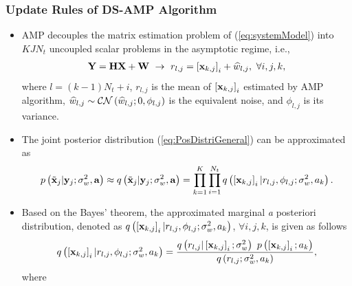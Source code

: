 \documentclass[9pt]{beamer}
\let \it = \textit
\begin{document}
\begin{frame}
\frametitle{Update Rules of DS-AMP Algorithm}
\begin{itemize}
\item
AMP decouples the matrix estimation problem of (\ref{eq:systemModel}) into $KJN_t$ uncoupled scalar problems in the asymptotic regime, i.e.,
\begin{equation}\label{eq:systemdecoupled}
\begin{array}{l}
{\bf{Y}=\bf{ H}\bf{X}+{\bf{W}}}~\rightarrow~r_{l,j}=\left[{{\bf x}_{k,j}}\right]_i+\widehat{w}_{l,j},~\forall i,j,k,
\end{array}
\end{equation}
where $l=(k-1)N_t+i$, $r_{l,j}$ is the mean of $\left[{{\bf x}_{k,j}}\right]_i$ estimated by AMP algorithm, $\widehat{w}_{l,j}\sim{\cal C}{\cal N}\left({{\widehat{w}_{l,j};0,\phi_{l,j}}}\right)$ is the equivalent noise, and $\phi_{l,j}$ is its variance.
\item 
The joint posterior distribution (\ref{eq:PosDistriGeneral}) can be approximated as
\begin{align}
\label{eq:PosDistriApproxi}p\left({\tilde{\bf x}_j|{\bf y}_j;\sigma_w^2, {\bf a}}\right)\approx q\left({\tilde{\bf x}_j|{\bf y}_j;\sigma_w^2, {\bf a}}\right)
=\prod\limits_{k=1}^{K}\prod\limits_{i=1}^{N_t}q\left({\left[{{\bf x}_{k,j}}\right]_i|r_{l,j}, \phi_{l,j};\sigma_w^2, a_k}\right).
\end{align}
\item
Based on the Bayes' theorem, the approximated marginal {\it a posteriori} distribution, denoted as $q\left({\left[{{\bf x}_{k,j}}\right]_i|r_{l,j}, \phi_{l,j};\sigma_w^2, a_k}\right)$, $\forall i,j,k$, is given as follows
\begin{equation}\label{eq:PosMarginalAMP}
\begin{array}{l}
q\left({\left[{{\bf x}_{k,j}}\right]_i|r_{l,j}, \phi_{l,j};\sigma_w^2, a_k}\right)
=\dfrac{q\left({r_{l,j}|\left[{{\bf x}_{k,j}}\right]_i;\sigma_w^2}\right)~p\left({\left[{{\bf x}_{k,j}}\right]_i;a_k}\right)}{q\left({r_{l,j};\sigma_w^2, a_k}\right)},
\end{array}
\end{equation}
where
\end{itemize}
\end{frame}
\end{document}
